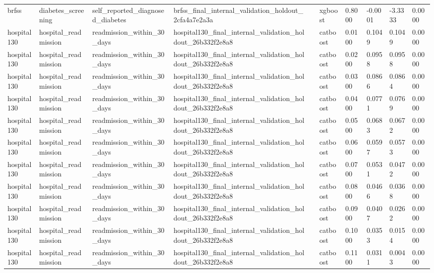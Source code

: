 \begin{tabular}{llllllllll}
brfss & diabetes\_screening & self\_reported\_diagnosed\_diabetes & brfss\_final\_internal\_validation\_holdout\_2cfa4a7e2a3a &  & xgboost & 0.8000 & -0.0001 & -3.3333 & 0.0000 \\
hospital130 & hospital\_readmission & readmission\_within\_30\_days & hospital130\_final\_internal\_validation\_holdout\_26b332f2e8a8 &  & catboost & 0.0100 & 0.1049 & 0.1049 & 0.0000 \\
hospital130 & hospital\_readmission & readmission\_within\_30\_days & hospital130\_final\_internal\_validation\_holdout\_26b332f2e8a8 &  & catboost & 0.0200 & 0.0958 & 0.0958 & 0.0000 \\
hospital130 & hospital\_readmission & readmission\_within\_30\_days & hospital130\_final\_internal\_validation\_holdout\_26b332f2e8a8 &  & catboost & 0.0300 & 0.0866 & 0.0864 & 0.0000 \\
hospital130 & hospital\_readmission & readmission\_within\_30\_days & hospital130\_final\_internal\_validation\_holdout\_26b332f2e8a8 &  & catboost & 0.0400 & 0.0771 & 0.0769 & 0.0000 \\
hospital130 & hospital\_readmission & readmission\_within\_30\_days & hospital130\_final\_internal\_validation\_holdout\_26b332f2e8a8 &  & catboost & 0.0500 & 0.0683 & 0.0672 & 0.0000 \\
hospital130 & hospital\_readmission & readmission\_within\_30\_days & hospital130\_final\_internal\_validation\_holdout\_26b332f2e8a8 &  & catboost & 0.0600 & 0.0597 & 0.0573 & 0.0000 \\
hospital130 & hospital\_readmission & readmission\_within\_30\_days & hospital130\_final\_internal\_validation\_holdout\_26b332f2e8a8 &  & catboost & 0.0700 & 0.0531 & 0.0472 & 0.0000 \\
hospital130 & hospital\_readmission & readmission\_within\_30\_days & hospital130\_final\_internal\_validation\_holdout\_26b332f2e8a8 &  & catboost & 0.0800 & 0.0466 & 0.0368 & 0.0000 \\
hospital130 & hospital\_readmission & readmission\_within\_30\_days & hospital130\_final\_internal\_validation\_holdout\_26b332f2e8a8 &  & catboost & 0.0900 & 0.0407 & 0.0262 & 0.0000 \\
hospital130 & hospital\_readmission & readmission\_within\_30\_days & hospital130\_final\_internal\_validation\_holdout\_26b332f2e8a8 &  & catboost & 0.1000 & 0.0353 & 0.0154 & 0.0000 \\
hospital130 & hospital\_readmission & readmission\_within\_30\_days & hospital130\_final\_internal\_validation\_holdout\_26b332f2e8a8 &  & catboost & 0.1100 & 0.0311 & 0.0043 & 0.0000 \\

\end{tabular}

